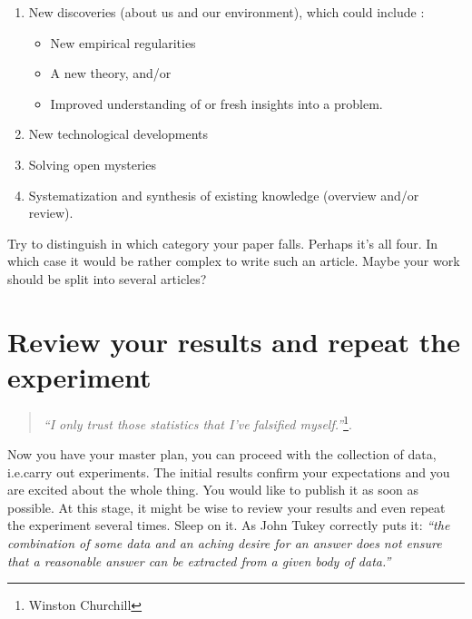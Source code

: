 \documentclass[graybox,envcountchap,sectrefs,UStrade]{svmono}
\begin{document}
\begin{enumerate}\renewcommand{\labelenumi}{\textit{\Roman{enumi}}.}
  \item New discoveries (about us and our environment), which could include \citep{Creedy2008research}:
  \begin{itemize}
  \renewcommand{\labelitemi}{$\circ$}
  \item New empirical regularities
  \item A new theory, and/or
  \item Improved understanding of or fresh insights into a problem.
\end{itemize}
  \item New technological developments
  \item Solving open mysteries
  \item Systematization and synthesis of existing knowledge (overview and/or review).
\end{enumerate}

Try to distinguish in which category your paper falls. Perhaps it's all four. In which case it would be rather complex to write such an article. Maybe your work should be split into several articles? \par


 \section{Review your results and repeat the experiment}

\begin{quote}
    \emph{``I only trust those statistics that I've falsified myself.''}\footnote{Winston Churchill}.
\end{quote}

Now you have your master plan, you can proceed with the collection of data, i.e.\@ carry out experiments. The initial results confirm your expectations and you are excited about the whole thing. You would like to publish it as soon as possible. At this stage, it might be wise to review your results and even repeat the experiment several times. Sleep on it. As John Tukey correctly puts it: \emph{``the combination of some data and an aching desire for an answer does not ensure that a reasonable answer can be extracted from a given body of data.''}\par
\end{document}
